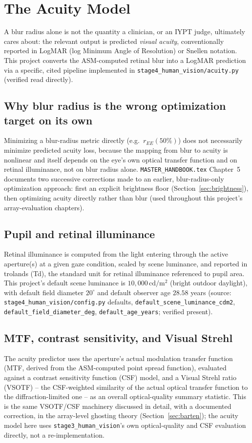 \chapter{The Acuity Model}
\label{ch:acuity}

A blur radius alone is not the quantity a clinician, or an IYPT judge, ultimately cares
about: the relevant output is predicted \emph{visual acuity}, conventionally reported
in LogMAR (log Minimum Angle of Resolution) or Snellen notation. This project converts
the ASM-computed retinal blur into a LogMAR prediction via a specific, cited pipeline
implemented in \texttt{stage4\_human\_vision/acuity.py} (verified read directly).

\section{Why blur radius is the wrong optimization target on its own}
Minimizing a blur-radius metric directly (e.g.\ $r_{EE}(50\%)$) does not necessarily
minimize predicted acuity loss, because the mapping from blur to acuity is nonlinear and
itself depends on the eye's own optical transfer function and on retinal illuminance,
not on blur radius alone. \texttt{MASTER\_HANDBOOK.tex} Chapter~5 documents two
successive corrections made to an earlier, blur-radius-only optimization approach: first
an explicit brightness floor (Section~\ref{sec:brightness}), then optimizing acuity
directly rather than blur (used throughout this project's array-evaluation chapters).

\section{Pupil and retinal illuminance}
Retinal illuminance is computed from the light entering through the active aperture(s)
at a given gaze condition, scaled by scene luminance, and reported in trolands (Td),
the standard unit for retinal illuminance referenced to pupil area. This project's
default scene luminance is $10{,}000\,\mathrm{cd/m^2}$ (bright outdoor daylight), with
default field diameter $20^\circ$ and default observer age $28.58$ years (source:
\texttt{stage4\_human\_vision/config.py} defaults, \texttt{default\_scene\_luminance\_cdm2},
\texttt{default\_field\_diameter\_deg}, \texttt{default\_age\_years}; verified present).

\section{MTF, contrast sensitivity, and Visual Strehl}
The acuity predictor uses the aperture's actual modulation transfer function (MTF,
derived from the ASM-computed point spread function), evaluated against a contrast
sensitivity function (CSF) model, and a Visual Strehl ratio (VSOTF) -- the CSF-weighted
similarity of the actual optical transfer function to the diffraction-limited one --
as an overall optical-quality summary statistic. This is the same VSOTF/CSF machinery
discussed in detail, with a documented correction, in the array-level ghosting theory
(Section~\ref{sec:barten}); the acuity model here uses \texttt{stage3\_human\_vision}'s
own optical-quality and CSF evaluation directly, not a re-implementation.

